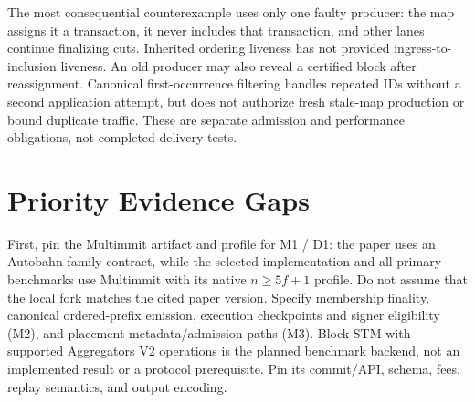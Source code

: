 \documentclass[11pt]{article}
\begin{document}
The most consequential counterexample uses only one faulty producer: the map assigns it a transaction, it never includes that transaction, and other lanes continue finalizing cuts. Inherited ordering liveness has not provided ingress-to-inclusion liveness. An old producer may also reveal a certified block after reassignment. Canonical first-occurrence filtering handles repeated IDs without a second application attempt, but does not authorize fresh stale-map production or bound duplicate traffic. These are separate admission and performance obligations, not completed delivery tests.


\section{Priority Evidence Gaps}


First, pin the Multimmit artifact and profile for M1 / D1: the paper uses an Autobahn-family contract, while the selected implementation and all primary benchmarks use Multimmit with its native \(n\geq5f+1\) profile. Do not assume that the local fork matches the cited paper version. Specify membership finality, canonical ordered-prefix emission, execution checkpoints and signer eligibility (M2), and placement metadata/admission paths (M3). Block-STM with supported Aggregators V2 operations is the planned benchmark backend, not an implemented result or a protocol prerequisite. Pin its commit/API, schema, fees, replay semantics, and output encoding. \citep{multimmit,blockstm,aip47}
\end{document}

